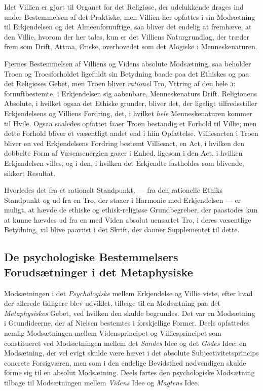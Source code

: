 \documentclass[12pt,a4paper]{book}
\newcommand{\opage}[1]{\marginnote{\footnotesize\textit{[#1]}}}
\begin{document}
Idet Villien er gjort til Organet for det Religiøse, der udelukkende drages ind under
Bestemmelsen af det Praktiske, men Villien her opfattes i sin Modsætning til Erkjendelsen og
det Almeenfornuftige, saa bliver det endelig at fremhæve, at den Villie, hvorom der her
tales, kun er det Villiens Naturgrundlag, der træder frem som Drift, Attraa, Ønske,
overhovedet som det Alogiske i Menneskenaturen.

Fjernes Bestemmelsen af Villiens og Videns absolute Modsætning, saa beholder Troen og
Troesforholdet ligefuldt sin Betydning baade paa det Ethiskes og paa det Religiøses Gebet,
men Troen bliver \emph{rationel} Tro, Yttring af den hele ɔ: fornuftbestemte, i Erkjendelsen
sig aabenbare, Menneskenaturs Drift. Religionens Absolute, i hvilket ogsaa det Ethiske
grunder, bliver det, der ligeligt tilfredsstiller Erkjendelsens og Villiens Fordring, det, i
hvilket \emph{hele} Menneskenaturen kommer til Hvile. Ogsaa saaledes opfattet faaer Troen
bestandig et Forhold til Villie; men dette Forhold bliver et væsentligt andet end i hiin
Opfattelse. Villiesacten i Troen bliver en ved Erkjendelsens Fordring bestemt Villiesact, en
Act, i hvilken den dobbelte Form af Væsensenergien gaaer i Enhed, ligesom i den Act, i
hvilken \opage{171}Erkjendelsen villes, og i den, i hvilken det Erkjendte fastholdes som blivende,
sikkert Resultat.

Hvorledes det fra et rationelt Standpunkt, --- fra den rationelle Ethiks Standpunkt og ud fra
en Tro, der staaer i Harmonie med Erkjendelsen --- er muligt, at hævde de ethiske og
ethisk-religiøse Grundbegreber, der paastodes kun at kunne hævdes ud fra en med Viden absolut
uensartet Tro, i deres væsentlige Betydning, vil blive paaviist i det Skrift, der danner
Supplementet til dette.

\subsection{De psychologiske Bestemmelsers Forudsætninger i det
  Metaphysiske}
\label{ssec:metaphysisk}

Modsætningen i det \emph{Psychologiske} mellem Erkjendelse og Villie viste, efter hvad der allerede
tidligere blev udviklet, tilbage til en Modsætning paa det \emph{Metaphysiskes} Gebet, ved hvilken
den skulde begrundes. Det var en Modsætning i Grundideerne, der af Nielsen bestemtes i
forskjellige Former. Deels opfattedes nemlig Modsætningen mellem Vidensprincipet og
Villiesprincipet som constitueret ved Modsætningen mellem det \emph{Sandes} Idee og det
\emph{Godes} Idee: en Modsætning, der vel evigt skulde være hævet i det absolute
Subjectivitetsprincips concrete Forsigværen, men som i den endelige Bevidsthed nødvendigen
skulde forme sig til en absolut Modsætning. Deels førtes den psychologiske Modsætning tilbage
til Modsætningen mellem \emph{Videns} Idee og \emph{Magtens} Idee.
\end{document}
